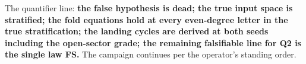 \documentclass[11pt]{article}
\begin{document}
The quantifier line: \textbf{the false hypothesis is dead; the true
input space is stratified; the fold equations hold at every even-degree
letter in the true stratification; the landing cycles are derived at
both seeds including the open-sector grade; the remaining falsifiable
line for Q2 is the single law FS.} The campaign continues per the
operator's standing order.
\end{document}
